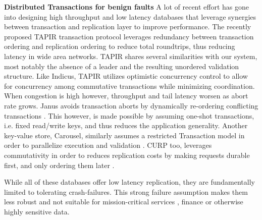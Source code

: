 \textbf{Distributed Transactions for benign faults}
A lot of recent effort has gone into designing high throughput and low latency databases that leverage synergies between transaction and replication layer to improve performance. The recently proposed TAPIR transaction protocol leverages redundancy between transaction ordering and replication ordering to reduce total roundtrips, thus reducing latency in wide area networks. TAPIR shares several similarities with our system, most notably the absence of a leader and the resulting unordered validation structure. Like Indicus, TAPIR utilizes optimistic concurrency control to allow for concurrency among commutative transactions while minimizing coordination. When congestion is high however, throughput and tail latency worsen as abort rate grows. Janus avoids transaction aborts by dynamically re-ordering conflicting transactions \cite{mu2016consolidating}. This however, is made possible by assuming one-shot transactions, i.e. fixed read/write keys, and thus reduces the application generality. Another key-value store, Carousel, similarly assumes a restricted Transaction model in order to parallelize execution and validation \cite{yan2018carousel}. CURP too, leverages commutativity in order to reduces replication costs by making requests durable first, and only ordering them later \cite{park2019exploiting}. 

While all of these databases offer low latency replication, they are fundamentally limited to tolerating crash-failures. This strong failure assumption makes them less robust and not suitable for mission-critical services \cite{Abdollah2007}, finance or otherwise highly sensitive data.

